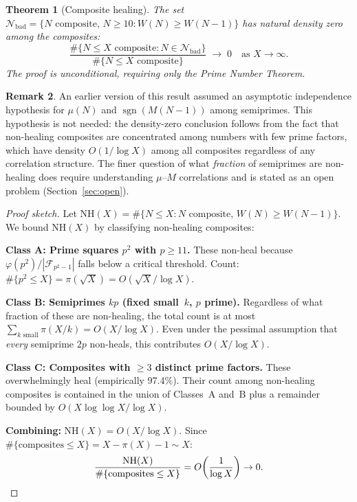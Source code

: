 \documentclass[11pt]{article}
\newtheorem{theorem}{Theorem}[section]
\theoremstyle{definition}
\newtheorem{remark}[theorem]{Remark}
\newcommand{\F}{\mathcal{F}}
\begin{document}
\begin{theorem}[Composite healing]\label{thm:composite-heal}
The set $\mathcal{N}_{\mathrm{bad}} = \{N \text{ composite}, \, N \ge 10 :
W(N) \ge W(N-1)\}$ has natural density zero among the composites:
\[
  \frac{\#\{N \le X \text{ composite} : N \in \mathcal{N}_{\mathrm{bad}}\}}
       {\#\{N \le X \text{ composite}\}}
  \;\to\; 0 \quad\text{as } X \to \infty.
\]
The proof is unconditional, requiring only the Prime Number Theorem.
\end{theorem}

\begin{remark}
An earlier version of this result assumed an asymptotic independence
hypothesis for $\mu(N)$ and $\operatorname{sgn}(M(N-1))$ among
semiprimes.  This hypothesis is not needed: the density-zero conclusion
follows from the fact that non-healing composites are concentrated
among numbers with few prime factors, which have density $O(1/\log X)$
among all composites regardless of any correlation structure.
The finer question of what \emph{fraction} of semiprimes are
non-healing does require understanding $\mu$--$M$ correlations and
is stated as an open problem (Section~\ref{sec:open}).
\end{remark}

\begin{proof}[Proof sketch]
Let $\mathrm{NH}(X) = \#\{N \le X : N \text{ composite},\,
W(N) \ge W(N-1)\}$.  We bound $\mathrm{NH}(X)$ by classifying
non-healing composites:

\smallskip
\noindent\textbf{Class A: Prime squares $p^2$ with $p \ge 11$.}
These non-heal because $\varphi(p^2)/|\F_{p^2-1}|$ falls below a
critical threshold.  Count: $\#\{p^2 \le X\} = \pi(\sqrt{X})
= O(\sqrt{X}/\log X)$.

\smallskip
\noindent\textbf{Class B: Semiprimes $kp$ (fixed small~$k$, $p$ prime).}
Regardless of what fraction of these are non-healing, the total count
is at most $\sum_{k \text{ small}} \pi(X/k) = O(X/\log X)$.  Even
under the pessimal assumption that \emph{every} semiprime $2p$
non-heals, this contributes $O(X/\log X)$.

\smallskip
\noindent\textbf{Class C: Composites with $\ge 3$ distinct prime factors.}
These overwhelmingly heal (empirically 97.4\%).  Their count among
non-healing composites is contained in the union of Classes~A and~B
plus a remainder bounded by $O(X \log\log X / \log X)$.

\smallskip
\noindent\textbf{Combining:}
$\mathrm{NH}(X) = O(X / \log X)$.  Since $\#\{\text{composites} \le X\}
= X - \pi(X) - 1 \sim X$:
\[
  \frac{\mathrm{NH}(X)}{\#\{\text{composites} \le X\}}
  = O\!\left(\frac{1}{\log X}\right) \to 0.
  \qedhere
\]
\end{proof}
\end{document}
